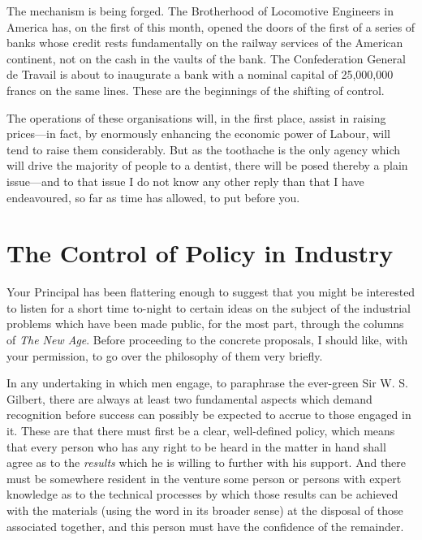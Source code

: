 \documentclass{book}
\begin{document}
The mechanism is being forged. The Brotherhood of Locomotive Engineers in America has, on the first of this month, opened the doors of the first of a series of banks whose credit rests fundamentally on the railway services of the American continent, not on the cash in the vaults of the bank. The Confederation General de Travail is about to inaugurate a bank with a nominal capital of 25,000,000 francs on the same lines. These are the beginnings of the shifting of control.

The operations of these organisations will, in the first place, assist in raising prices—in fact, by enormously enhancing the economic power of Labour, will tend to raise them considerably. But as the toothache is the only agency which will drive the majority of people to a dentist, there will be posed thereby a plain issue—and to that issue I do not know any other reply than that I have endeavoured, so far as time has allowed, to put before you.

\chapter{The Control of Policy in Industry}
\label{chapter-2}
Your Principal has been flattering enough to suggest that you might be interested to listen for a short time to-night to certain ideas on the subject of the industrial problems which have been made public, for the most part, through the columns of \emph{The New Age}. Before proceeding to the concrete proposals, I should like, with your permission, to go over the philosophy of them very briefly.

In any undertaking in which men engage, to paraphrase the ever-green Sir W. S. Gilbert, there are always at least two fundamental aspects which demand recognition before success can possibly be expected to accrue to those engaged in it. These are that there must first be a clear, well-defined policy, which means that every person who has any right to be heard in the matter in hand shall agree as to the \emph{results} which he is willing to further with his support. And there must be somewhere resident in the venture some person or persons with expert knowledge as to the technical processes by which those results can be achieved with the materials (using the word in its broader sense) at the disposal of those associated together, and this person must have the confidence of the remainder.
\end{document}
